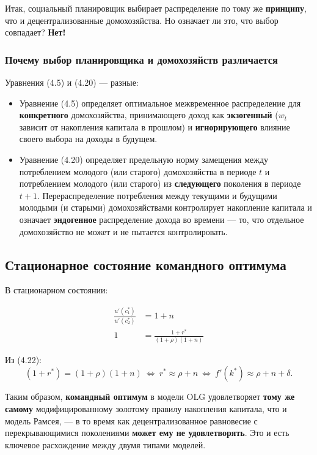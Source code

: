 \documentclass[10pt,a4paper]{article}
\begin{document}
Итак, социальный планировщик выбирает распределение по тому же \textbf{принципу}, что и децентрализованные домохозяйства. Но означает ли это, что выбор совпадает? \textbf{Нет!}

\subsubsection{Почему выбор планировщика и домохозяйств различается}

Уравнения (4.5) и (4.20) — разные:
\begin{itemize}[leftmargin=1.3em]
\item Уравнение (4.5) определяет оптимальное межвременное распределение для \textbf{конкретного} домохозяйства, принимающего доход как \textbf{экзогенный} ($w_t$ зависит от накопления капитала в прошлом) и \textbf{игнорирующего} влияние своего выбора на доходы в будущем.
\item Уравнение (4.20) определяет предельную норму замещения между потреблением молодого (или старого) домохозяйства в периоде $t$ и потреблением молодого (или старого) из \textbf{следующего} поколения в периоде $t+1$. Перераспределение потребления между текущими и будущими молодыми (и старыми) домохозяйствами контролирует накопление капитала и означает \textbf{эндогенное} распределение дохода во времени — то, что отдельное домохозяйство не может и не пытается контролировать.
\end{itemize}

\subsection{Стационарное состояние командного оптимума}

В стационарном состоянии:
\begin{formulabox}
\begin{align}
\frac{u'(c_1^{*})}{u'(c_2^{*})} &= 1+n \tag{4.21}\\
1 &= \frac{1+r^{*}}{(1+\rho)(1+n)} \tag{4.22}
\end{align}
\end{formulabox}

Из (4.22):
$$(1+r^{*}) = (1+\rho)(1+n) \ \Leftrightarrow\ r^{*} \approx \rho+n \ \Leftrightarrow\ f'(k^{*}) \approx \rho+n+\delta.$$

\begin{intuition}
Таким образом, \textbf{командный оптимум} в модели OLG удовлетворяет \textbf{тому же самому} модифицированному золотому правилу накопления капитала, что и модель Рамсея, — в то время как децентрализованное равновесие с перекрывающимися поколениями \textbf{может ему не удовлетворять}. Это и есть ключевое расхождение между двумя типами моделей.
\end{intuition}
\end{document}
